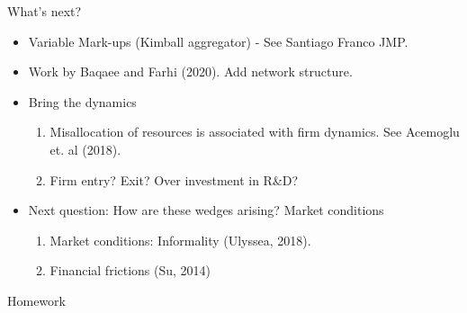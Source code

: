 \documentclass[usenames,dvipsnames,aspectratio=169]{beamer}
\begin{document}
\begin{frame}{What's next?}
    \begin{itemize}
        \item Variable Mark-ups (Kimball aggregator) - See Santiago Franco JMP. 
        \vfill
        \item Work by Baqaee and Farhi (2020). Add network structure. 
        \vfill
        \item Bring the dynamics
        \begin{enumerate}
            \item Misallocation of resources is associated with firm dynamics. See Acemoglu et. al (2018). 
            \item Firm entry? Exit? Over investment in R\&D? 
        \end{enumerate}
        \vfill
        \item Next question: How are these wedges arising? Market conditions
        \begin{enumerate}
            \item Market conditions: Informality (Ulyssea, 2018). 
            \item Financial frictions (Su, 2014)
        \end{enumerate}
    \end{itemize}
\end{frame}

\begin{frame}[allowframebreaks]{Homework}

\end{frame}
\end{document}
